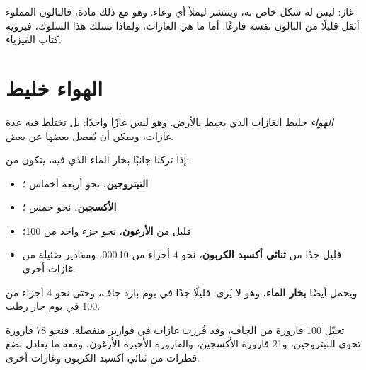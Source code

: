 \begin{remark}\label{rem:g4:air-a-mixture-of-gases:gas}
 غاز: ليس له شكل خاص به، وينتشر ليملأ أي وعاء. وهو مع ذلك
مادة، فالبالون المملوء  أثقل قليلًا من البالون نفسه فارغًا. أما
ما هي الغازات، ولماذا تسلك هذا السلوك، فيرويه كتاب الفيزياء.
\end{remark}

\section{الهواء خليط}

\begin{definition}[الهواء]\label{def:g4:air-a-mixture-of-gases:air}
\emph{الهواء} خليط الغازات الذي يحيط بالأرض. وهو ليس غازًا
واحدًا: بل تختلط فيه عدة غازات، ويمكن أن يُفصل بعضها عن
بعض.
\end{definition}

\begin{proposition}\label{prop:g4:air-a-mixture-of-gases:composition}
إذا تركنا جانبًا بخار الماء الذي فيه،  يتكون من:
\begin{itemize}
  \item \textbf{النيتروجين}، نحو أربعة أخماس ؛
  \item \textbf{الأكسجين}، نحو خمس ؛
  \item قليل من \textbf{الأرغون}، نحو جزء واحد من 100؛
  \item قليل جدًا من \textbf{ثنائي أكسيد الكربون}، نحو 4 أجزاء من 10\,000،
        ومقادير ضئيلة من غازات أخرى.
\end{itemize}
ويحمل  أيضًا \textbf{بخار الماء}، وهو لا يُرى: قليلًا جدًا في يوم
بارد جاف، وحتى نحو 4 أجزاء من 100 في يوم حار رطب.
\end{proposition}

\begin{example}\label{ex:g4:air-a-mixture-of-gases:hundred}
تخيّل 100 قارورة من  الجاف، وقد فُرزت غازات  في قوارير
منفصلة. فنحو 78 قارورة تحوي النيتروجين، و21 قارورة الأكسجين، والقارورة
الأخيرة الأرغون، ومعه ما يعادل بضع قطرات من ثنائي أكسيد الكربون
وغازات أخرى.
\end{example}

